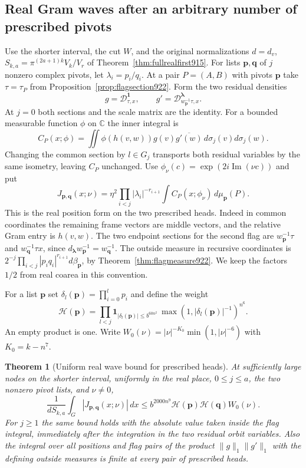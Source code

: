 \documentclass[a4paper,11pt]{article}
\newtheorem{theorem}[proposition]{Theorem}
\theoremstyle{definition}
\theoremstyle{remark}
\numberwithin{equation}{section}
\begin{document}
\subsection{Real Gram waves after an arbitrary number of prescribed pivots}
\label{sec:allrealwaves924}

Use the shorter interval, the cut \(W\), and the original
normalizations \(d=d_v\), \(S_{k,a}=\pi^{(2a+1)k}V_k/V_r\)
of Theorem~\ref{thm:fullrealfirst915}. For lists \(\mathbf p,\mathbf q\)
of \(j\) nonzero complex pivots, let \(\lambda_i=p_i/q_i\).
At a pair \(P=(A,B)\) with pivots \(\mathbf p\) take
\(\tau=\tau_P\) from Proposition~\ref{prop:flagsection922}.
Form the two residual densities
\[
 g=\mathcal D^{\mathbf1}_{\tau,x},\qquad
 g'=\mathcal D^{\boldsymbol\lambda}_{w_{\mathbf p}^{-1}\tau,x}.
\]
At \(j=0\) both sections and the scale matrix are the identity.
For a bounded measurable function \(\phi\) on \(\mathbb C\) the
inner integral is
\[
 C_P(x;\phi)=\iint
    \phi(h(v,w))g(v)\overline{g'(w)}\,d\sigma_j(v)d\sigma_j(w).
\]
Changing the common section by \(l\in G_j\) transports both
residual variables by the same isometry, leaving \(C_P\) unchanged.
Use \(\phi_\nu(c)=\exp(2i\operatorname{Im}(\nu c))\) and put
\[
 J_{\mathbf p,\mathbf q}(x;\nu)=
    \eta^2 \prod_{i<j}|\lambda_i|^{-r_{i+1}}
                  \int C_P(x;\phi_\nu)\,d\mu_{\mathbf p}(P).
\]
This is the real position form on the two prescribed heads.
Indeed in common coordinates the remaining frame vectors are
middle vectors, and the relative Gram entry is \(h(v,w)\).
The two endpoint sections for the second flag are
\(w_{\mathbf p}^{-1}\tau\) and \(w_{\mathbf q}^{-1}\tau x\),
since \(d_{\boldsymbol\lambda}w_{\mathbf p}^{-1}=w_{\mathbf q}^{-1}\).
The outside measure in recursive coordinates is
\(2^{-j}\prod_{i<j}|p_iq_i|^{r_{i+1}}d\beta_{\mathbf p}\), by
Theorem~\ref{thm:flagmeasure922}. We keep the factors \(1/2\)
from real coarea in this convention.

For a list \(\mathbf p\) set \(\delta_l(\mathbf p)=\prod_{i=0}^l p_i\)
and define the weight
\[
 \mathcal H(\mathbf p)=\prod_{l<j}
 {\boldsymbol 1}_{|\delta_l(\mathbf p)|\le b^{60n^2}}\,
                  \max(1,|\delta_l(\mathbf p)|^{-1})^{n^6}.
\]
An empty product is one. Write \(W_0(\nu)=|\nu|^{-K_0}
\min(1,|\nu|^{-6})\) with \(K_0=k-n^7\).

\begin{theorem}[Uniform real wave bound for prescribed heads]
\leavevmode\label{thm:allrealwaves924}
At sufficiently large nodes on the shorter interval, uniformly
in the real place, \(0\le j\le a\), the two nonzero pivot lists,
and \(\nu\ne0\),
\begin{equation}
 \frac1{d S_{k,a}}\int_G |J_{\mathbf p,\mathbf q}(x;\nu)|\,dx
 \le b^{2000n^9}\mathcal H(\mathbf p)\mathcal H(\mathbf q) W_0(\nu).
 \label{eq:allrealwaves924}
\end{equation}
For \(j\ge1\) the same bound holds with the absolute value taken
inside the flag integral, immediately after the integration
in the two residual orbit variables. Also the integral over all
positions and flag pairs of the product \(\|g\|_1\|g'\|_1\)
with the defining outside measures is finite at every pair
of prescribed heads.
\end{theorem}
\end{document}
